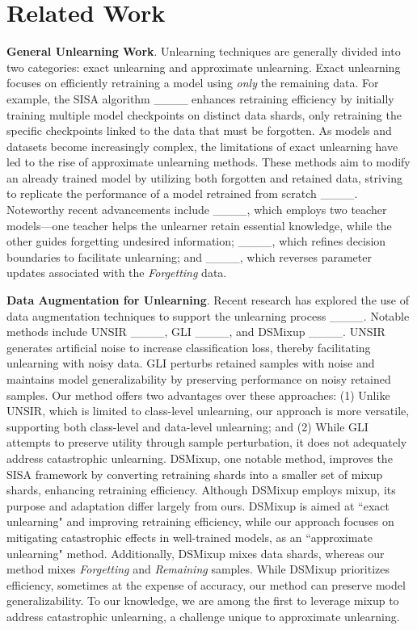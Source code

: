 \section{Related Work}


\textbf{General Unlearning Work}. Unlearning techniques are generally divided into two categories: exact unlearning and approximate unlearning. Exact unlearning focuses on efficiently retraining a model using \textit{only} the remaining data. For example, the SISA algorithm ____ enhances retraining efficiency by initially training multiple model checkpoints on distinct data shards, only retraining the specific checkpoints linked to the data that must be forgotten. As models and datasets become increasingly complex, the limitations of exact unlearning have led to the rise of approximate unlearning methods. These methods aim to modify an already trained model by utilizing both forgotten and retained data, striving to replicate the performance of a model retrained from scratch ____. Noteworthy recent advancements include ____, which employs two teacher models—one teacher helps the unlearner retain essential knowledge, while the other guides forgetting undesired information; ____, which refines decision boundaries to facilitate unlearning; and ____, which reverses parameter updates associated with the \textit{Forgetting} data.

\textbf{Data Augmentation for Unlearning}. Recent research has explored the use of data augmentation techniques to support the unlearning process ____. Notable methods include UNSIR ____, GLI ____, and DSMixup ____. UNSIR generates artificial noise to increase classification loss, thereby facilitating unlearning with noisy data. GLI perturbs retained samples with noise and maintains model generalizability by preserving performance on noisy retained samples. Our method offers two advantages over these approaches: (1) Unlike UNSIR, which is limited to class-level unlearning, our approach is more versatile, supporting both class-level and data-level unlearning; and (2) While GLI attempts to preserve utility through sample perturbation, it does not adequately address catastrophic unlearning. DSMixup, one notable method, improves the SISA framework by converting retraining shards into a smaller set of mixup shards, enhancing retraining efficiency. Although DSMixup employs mixup, its purpose and adaptation differ largely from ours. DSMixup is aimed at ``exact unlearning" and improving retraining efficiency, while our approach focuses on mitigating catastrophic effects in well-trained models, as an ``approximate unlearning" method. Additionally, DSMixup mixes data shards, whereas our method mixes \textit{Forgetting} and \textit{Remaining} samples. While DSMixup prioritizes efficiency, sometimes at the expense of accuracy, our method can preserve model generalizability. To our knowledge, we are among the first to leverage mixup to address catastrophic unlearning, a challenge unique to approximate unlearning.


